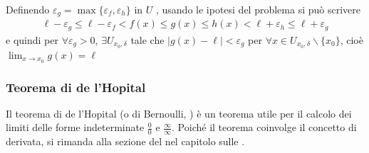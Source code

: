 \documentclass[letterpaper,10pt,italian]{jupyterBook}
\begin{document}
\sphinxAtStartPar
Definendo \(\varepsilon_g = \max\{ \varepsilon_f, \varepsilon_h \}\) in \(U\)  , usando le ipotesi del problema si può scrivere
\begin{equation*}
\begin{split}\ell - \varepsilon_g \le \ell - \varepsilon_f < f(x) \le g(x) \le h(x) < \ell + \varepsilon_h \le \ell + \varepsilon_g\end{split}
\end{equation*}
\sphinxAtStartPar
e quindi per  \(\forall \varepsilon_g > 0\), \(\exists U_{x_0,\delta}\) tale che \(|g(x) - \ell|<\varepsilon_g\) per \(\forall x \in U_{x_0,\delta} \backslash \{ x_0 \}\), cioè \(\lim_{x \rightarrow x_0} g(x) = \ell\)

\sphinxAtStartPar
{} 


\subsubsection{Teorema di de l’Hopital}
\label{\detokenize{ch/infinitesimal_calculus/analysis:teorema-di-de-l-hopital}}\label{\detokenize{ch/infinitesimal_calculus/analysis:infinitesimal-calculus-limits-thms-hopital}}
\sphinxAtStartPar
Il teorema di de l’Hopital (o di Bernoulli,  ) è un teorema utile per il calcolo dei limiti delle forme indeterminate \(\frac{0}{0}\) e \(\frac{\infty}{\infty}\). Poiché il teorema coinvolge il concetto di derivata, si rimanda alla sezione del {\hyperref[\detokenize{ch/infinitesimal_calculus/derivatives:infinitesimal-calculus-derivatives-thm-hopital}]{}} nel capitolo sulle {\hyperref[\detokenize{ch/infinitesimal_calculus/derivatives:infinitesimal-calculus-derivatives}]{}}.
\end{document}
